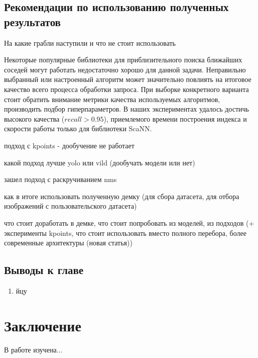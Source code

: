 \documentclass[a4paper,14pt]{article}
\begin{document}
    \subsection{Рекомендации по использованию полученных результатов}
    
    На какие грабли наступили и что не стоит использовать
    
    Некоторые популярные библиотеки для приблизительного поиска ближайших соседей могут работать недостаточно хорошо для данной задачи.
    Неправильно выбранный или настроенный алгоритм может значительно повлиять на итоговое качество всего процесса обработки запроса.
    При выборке конкретного варианта стоит обратить внимание метрики качества используемых алгоритмов, производить подбор гиперпараметров.
    В наших экспериментах удалось достичь высокого качества ($recall > 0.95$), приемлемого времени построения индекса и скорости работы только для библиотеки ScaNN.
    
    
    подход с kpoints - дообучение не работает
    
    какой подход лучше yolo или vild (дообучать модели или нет)
    
    зашел подход с раскручиванием nms
    
    как в итоге использовать полученную демку (для сбора датасета, для отбора изображений с пользовательского датасета)
    
    что стоит доработать в демке, что стоит попробовать из моделей, из подходов (+ эксперименты kpoints, что стоит использовать вместо полного перебора, более современные архитектуры (новая статья))
       
    \subsection{Выводы к главе \thesection}
    \begin{enumerate}
        [1)]
        \itemsep0em
        \item йцу
    \end{enumerate}

    \newpage


    \section{Заключение}

    В работе изучена...
    
    \newpage
    \renewcommand{\refname}{{\normalsize \hfill Список использованных источников \hfill}}
%    
    
    
    \newpage
\end{document}
